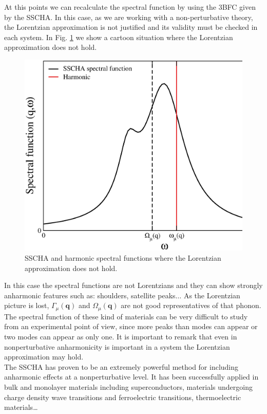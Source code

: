 At this points we can recalculate the spectral function by using the 3BFC given by the SSCHA. In this case, as we are working with a non-perturbative theory, the Lorentzian approximation is not justified and its validity must be checked in each system. In Fig. \ref{instoy2} we show a cartoon situation where the Lorentzian approximation does not hold.
\begin{figure}[h]
\begin{center}
\includegraphics[width=0.9\linewidth]{Figures/ins-toy2.eps}
\caption[SSCHA and harmonic spectral functions]{SSCHA and harmonic spectral functions where the Lorentzian approximation does not hold.}
\label{instoy2}
\end{center}
\end{figure}
In this case the spectral functions are not Lorentzians and they can show strongly anharmonic features such as: shoulders, satellite peaks$\dots$ As the Lorentzian picture is lost, $\Gamma_{\mu}(\mathbf{q})$ and $\Omega_{\mu}(\mathbf{q})$ are not good representatives of that phonon. The spectral function of these kind of materials can be very difficult to study from an experimental point of view, since more peaks than modes can appear or two modes can appear as only one. It is important to remark that even in nonperturbative anharmonicity is important in a system the Lorentzian approximation may hold. \\

The SSCHA has proven to be an extremely powerful method for including anharmonic effects at a nonperturbative level. It has been successfully applied in bulk and monolayer materials including 
superconductors\cite{errea2013first,errea2016quantum}, materials undergoing charge density wave 
transitions\cite{leroux2015strong,bianco2019quantum} and ferroelectric transitions\cite{ribeiro2018strong}, 
thermoelectric materials\cite{aseginolaza2019phonon}\dots
